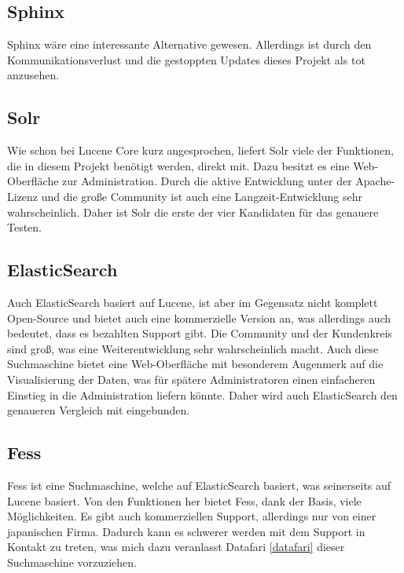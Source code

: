 \subsection{Sphinx}

Sphinx wäre eine interessante Alternative gewesen. Allerdings ist durch den Kommunikationsverlust und die gestoppten Updates dieses Projekt als tot anzusehen. \cite{SphinxTechnologiesInc.2019}

\subsection{Solr}

Wie schon bei Lucene Core kurz angesprochen, liefert Solr viele der Funktionen, die in diesem Projekt benötigt werden, direkt mit. Dazu besitzt es eine Web-Oberfläche zur Administration. Durch die aktive Entwicklung unter der Apache-Lizenz und die große Community ist auch eine Langzeit-Entwicklung sehr wahrscheinlich. Daher ist Solr die erste der vier Kandidaten für das genauere Testen. \cite{TheApacheSoftwareFoundation.2019}

\subsection{ElasticSearch}

Auch ElasticSearch basiert auf Lucene, ist aber im Gegensatz nicht komplett Open-Source und bietet auch eine kommerzielle Version an, was allerdings auch bedeutet, dass es bezahlten Support gibt. Die Community und der Kundenkreis sind groß, was eine Weiterentwicklung sehr wahrscheinlich macht. Auch diese Suchmaschine bietet eine Web-Oberfläche mit besonderem Augenmerk auf die Visualisierung der Daten, was für spätere Administratoren einen einfacheren Einstieg in die Administration liefern könnte. Daher wird auch ElasticSearch den genaueren Vergleich mit eingebunden. \cite{Elasticsearch.2019}

\subsection{Fess}

Fess ist eine Suchmaschine, welche auf ElasticSearch basiert, was seinerseits auf Lucene basiert. Von den Funktionen her bietet Fess, dank der Basis, viele Möglichkeiten. Es gibt auch kommerziellen Support, allerdings nur von einer japanischen Firma. Dadurch kann es schwerer werden mit dem Support in Kontakt zu treten, was mich dazu veranlasst Datafari \ref{datafari} dieser Suchmaschine vorzuziehen. \cite{CodeLibs.2019}

